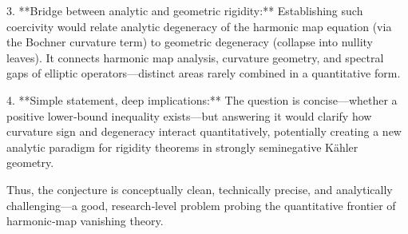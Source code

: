 3. **Bridge between analytic and geometric rigidity:**  
   Establishing such coercivity would relate analytic degeneracy of the harmonic map equation (via the Bochner curvature term) to geometric degeneracy (collapse into nullity leaves).  It connects harmonic map analysis, curvature geometry, and spectral gaps of elliptic operators—distinct areas rarely combined in a quantitative form.

4. **Simple statement, deep implications:**  
   The question is concise—whether a positive lower‐bound inequality exists—but answering it would clarify how curvature sign and degeneracy interact quantitatively, potentially creating a new analytic paradigm for rigidity theorems in strongly seminegative Kähler geometry.

Thus, the conjecture is conceptually clean, technically precise, and analytically challenging—a good, research‑level problem probing the quantitative frontier of harmonic‑map vanishing theory.